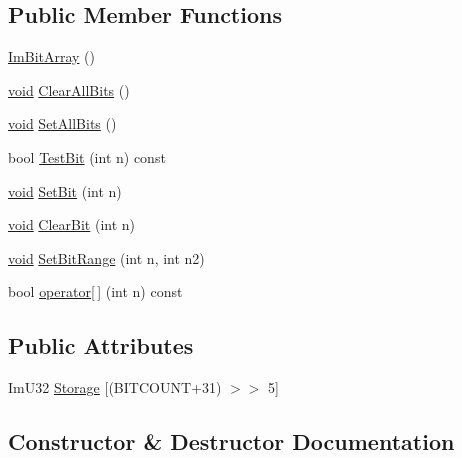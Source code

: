 \subsection*{Public Member Functions}
\begin{DoxyCompactItemize}
\item 
\hyperlink{structImBitArray_a243a21e76a7355afc5820f3a64168327}{Im\+Bit\+Array} ()
\item 
\hyperlink{imgui__impl__opengl3__loader_8h_ac668e7cffd9e2e9cfee428b9b2f34fa7}{void} \hyperlink{structImBitArray_ae0cc61bba70a3f2994f28130d9de76f4}{Clear\+All\+Bits} ()
\item 
\hyperlink{imgui__impl__opengl3__loader_8h_ac668e7cffd9e2e9cfee428b9b2f34fa7}{void} \hyperlink{structImBitArray_a52c1f3ec6a89c91e2090bf75e00152ac}{Set\+All\+Bits} ()
\item 
bool \hyperlink{structImBitArray_a803e52b9d1653dca6cac959cb84d64e9}{Test\+Bit} (int n) const
\item 
\hyperlink{imgui__impl__opengl3__loader_8h_ac668e7cffd9e2e9cfee428b9b2f34fa7}{void} \hyperlink{structImBitArray_a8c4d1a352cbd565200c8fe983c879022}{Set\+Bit} (int n)
\item 
\hyperlink{imgui__impl__opengl3__loader_8h_ac668e7cffd9e2e9cfee428b9b2f34fa7}{void} \hyperlink{structImBitArray_a48d77393cf81d3a7c4b94a90be6ee66f}{Clear\+Bit} (int n)
\item 
\hyperlink{imgui__impl__opengl3__loader_8h_ac668e7cffd9e2e9cfee428b9b2f34fa7}{void} \hyperlink{structImBitArray_a7a3a4472aaf1eb8a6fe5f7aeed155b54}{Set\+Bit\+Range} (int n, int n2)
\item 
bool \hyperlink{structImBitArray_ae1b3a57b35efd1f1ffb51629cce38c14}{operator\mbox{[}$\,$\mbox{]}} (int n) const
\end{DoxyCompactItemize}
\subsection*{Public Attributes}
\begin{DoxyCompactItemize}
\item 
Im\+U32 \hyperlink{structImBitArray_abcacf6438b637293c8b3d475079b7eb6}{Storage} \mbox{[}(B\+I\+T\+C\+O\+U\+NT+31) $>$$>$ 5\mbox{]}
\end{DoxyCompactItemize}


\subsection{Constructor \& Destructor Documentation}
\mbox{\label{structImBitArray_a243a21e76a7355afc5820f3a64168327}} 
